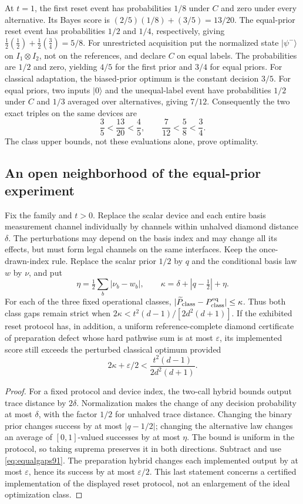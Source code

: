 At $t=1$, the first reset event has probabilities $1/8$ under $C$ and
zero under every alternative.  Its Bayes score is
$(2/5)(1/8)+(3/5)=13/20$.
The equal-prior reset event has probabilities $1/2$ and $1/4$,
respectively, giving $\frac12(\frac12)+\frac12(\frac34)=5/8$.
For unrestricted acquisition put the normalized state $|\psi^-\rangle$
on $I_1\otimes I_2$, not on the references, and declare $C$ on equal
labels.  The probabilities are $1/2$ and zero, yielding $4/5$ for the
first prior and $3/4$ for equal priors.  For classical adaptation,
the biased-prior optimum is the constant decision $3/5$.
For equal priors, two inputs $|0\rangle$ and the unequal-label event
have probabilities $1/2$ under $C$ and $1/3$ averaged over alternatives,
giving $7/12$.  Consequently the two exact triples on the same devices are
\[
 \frac35<\frac{13}{20}<\frac45,
 \qquad
 \frac7{12}<\frac58<\frac34.
\]
The class upper bounds, not these evaluations alone, prove optimality.

\subsection{An open neighborhood of the equal-prior experiment}
\begin{corollary}\label{cor:gamestability91}
Fix the family and $t>0$.  Replace the scalar device and each entire
basis measurement channel individually by channels within unhalved
diamond distance $\delta$.  The perturbations may depend on the basis
index and may change all its effects, but must form legal channels on
the same interfaces.  Keep the once-drawn-index rule.  Replace the
scalar prior $1/2$ by $q$ and the conditional basis law $w$ by $\nu$,
and put
\[
 \eta=\tfrac12\sum_b|\nu_b-w_b|,\qquad
 \kappa=\delta+|q-\tfrac12|+\eta.
\]
For each of the three fixed operational classes,
$|\widetilde P_{\rm class}-P_{\rm class}^{\rm eq}|\le\kappa$.
Thus both class gaps remain strict when
$2\kappa<t^2(d-1)/[2d^2(d+1)]$.
If the exhibited reset protocol has, in addition, a uniform
reference-complete diamond certificate of preparation defect whose
hard pathwise sum is at most $\varepsilon$, its implemented score
still exceeds the perturbed classical optimum provided
\[
 2\kappa+\varepsilon/2<\frac{t^2(d-1)}{2d^2(d+1)}.
\]
\end{corollary}
\begin{proof}
For a fixed protocol and device index, the two-call hybrid bounds
output trace distance by $2\delta$.  Normalization makes the change
of any decision probability at most $\delta$, with the factor $1/2$
for unhalved trace distance.  Changing the binary prior changes success
by at most $|q-1/2|$; changing the alternative law changes an average
of $[0,1]$-valued successes by at most $\eta$.  The bound is uniform
in the protocol, so taking suprema preserves it in both directions.
Subtract and use \eqref{eq:equalgaps91}.
The preparation hybrid changes each implemented output by at most
$\varepsilon$, hence its success by at most $\varepsilon/2$.
This last statement concerns a certified implementation of the displayed
reset protocol, not an enlargement of the ideal optimization class.
\end{proof}
